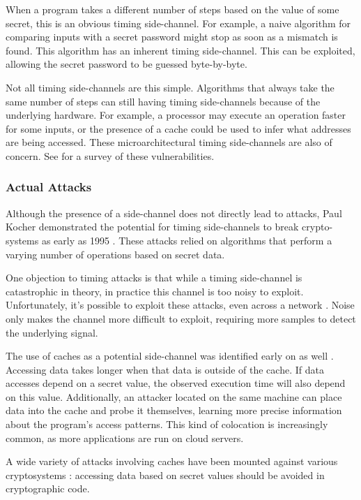 \documentclass[11pt, a4paper]{article} %
\begin{document}
{When a program takes a different number of steps based on the value of some
secret, this is an obvious timing side-channel.
For example, a naive algorithm for comparing inputs with a secret password
might stop as soon as a mismatch is found. This algorithm has
an inherent timing side-channel. This can be exploited,
allowing the secret password to be guessed byte-by-byte.

Not all timing side-channels are this simple. Algorithms
that always take the same number of steps
can still having timing side-channels because of the underlying
hardware. For example, a processor may
execute an operation faster for some inputs, or the presence of a cache
could be used to infer what addresses are being accessed. These
microarchitectural timing side-channels are also of concern.
See \cite{ge_survey_2018} for a survey of these vulnerabilities.

\subsubsection{Actual Attacks}

Although the presence of a side-channel
does not directly lead to attacks,
Paul Kocher
demonstrated the potential for timing side-channels to break
crypto-systems as early as 1995
\cite{kocher_cryptanalysis_1995, kocher_timing_1996}.
These attacks relied on algorithms that perform a varying number of
operations based on secret data. 

One objection to timing attacks is that
while a timing side-channel is catastrophic in theory, in practice
this channel is too noisy to exploit. Unfortunately,
it's possible to exploit these attacks, even across
a network \cite{brumley_remote_2005, brumley_remote_2011}.
Noise only makes the channel more difficult to exploit,
requiring more samples to detect the underlying signal.

The use of caches as a potential side-channel was
identified early on as well \cite{page_theoretical_2002}.
Accessing data takes longer when that data is outside
of the cache.
If data accesses depend on a secret value, the observed execution
time will also depend on this value. Additionally,
an attacker located on the same machine
can place data into the cache and probe it themselves,
learning more precise information about the
program's access patterns. This kind of colocation is increasingly common,
as more applications are run on cloud servers.

A wide variety of attacks involving caches have been mounted
against various cryptosystems
\cite{
  bernstein_cache-timing_2005,
  yarom_cachebleed_2017,
  cabrera_aldaya_cache-timing_2019}
: accessing data based on secret values should
be avoided in cryptographic code.

}
\end{document}
